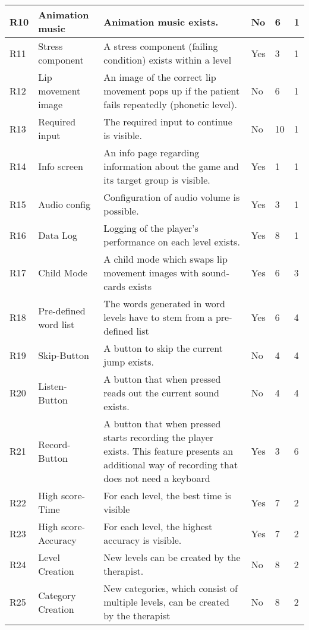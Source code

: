 \documentclass[draft,final]{vutinfth} %
\begin{document}
\begin{longtable}[h]{|p{}|p{}|p{}|p{}|p{}|p{}|}
R10 & Animation music &  Animation music exists. & No & 6 &1\\ \hline
R11 & Stress component &  A stress component (failing condition) exists within a level & Yes & 3 &1\\ \hline
R12 & Lip movement image &  An image of the correct lip movement pops up if the patient fails repeatedly (phonetic level). & No & 6 &1\\ \hline
R13 & Required input &  The required input to continue is visible. & No & 10 &1\\ \hline
R14 & Info screen &  An info page regarding information about the game and its target group is visible. & Yes & 1 &1\\ \hline
R15 & Audio config &  Configuration of audio volume is possible. & Yes & 3 &1\\ \hline
R16 & Data Log &  Logging of the player's performance on each level exists. & Yes & 8 &1\\ \hline
R17 & Child Mode &  A child mode which swaps lip movement images with sound-cards exists & Yes & 6 & 3\\ \hline
R18 & Pre-defined word list &  The words generated in word levels have to stem from a pre-defined list & Yes & 6 & 4\\ \hline
R19 & Skip-Button &  A button to skip the current jump exists. & No & 4 & 4\\ \hline
R20 & Listen-Button &  A button that when pressed reads out the current sound exists. & No & 4 & 4\\ \hline
R21 & Record-Button &  A button that when pressed starts recording the player exists. This feature presents an additional way of recording that does not need a keyboard & Yes & 3 & 6\\ \hline
R22 & High score-Time & For each level, the best time is visible & Yes & 7  & 2\\ \hline
R23 & High score-Accuracy &  For each level, the highest accuracy is  visible. & Yes & 7 & 2\\ \hline
R24 & Level Creation &  New levels can be created by the therapist. & No & 8 & 2\\ \hline
R25 & Category Creation & New categories, which consist of multiple levels, can be created by the therapist & No & 8 & 2\\ \hline

\end{longtable}
\end{document}
